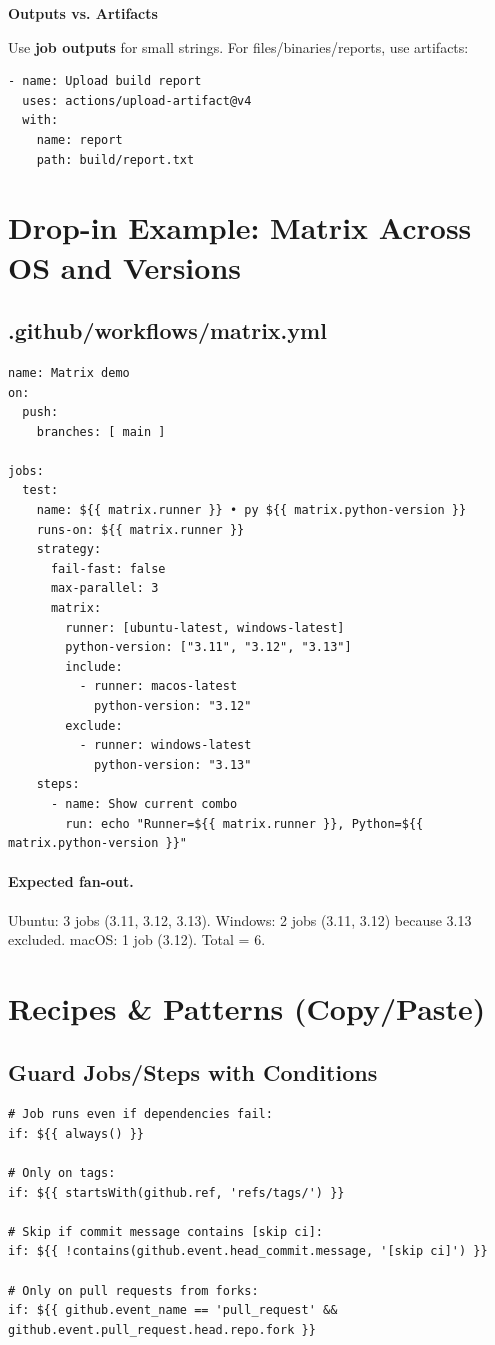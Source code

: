 \documentclass[11pt]{article}
\newenvironment{callout}[1]{%
  \def\FrameCommand{\fcolorbox{calloutframe}{calloutback}}%
  \MakeFramed{\advance\hsize-\width \FrameRestore}%
  \noindent\textbf{#1}\par\medskip
}{%
  \endMakeFramed
}
\begin{document}
\begin{callout}{Outputs vs. Artifacts}
Use \textbf{job outputs} for small strings. For files/binaries/reports, use artifacts:
\end{callout}

\begin{verbatim}
- name: Upload build report
  uses: actions/upload-artifact@v4
  with:
    name: report
    path: build/report.txt
\end{verbatim}

\section{Drop-in Example: Matrix Across OS and Versions}
\subsection*{.github/workflows/matrix.yml}
\begin{verbatim}
name: Matrix demo
on:
  push:
    branches: [ main ]

jobs:
  test:
    name: ${{ matrix.runner }} • py ${{ matrix.python-version }}
    runs-on: ${{ matrix.runner }}
    strategy:
      fail-fast: false
      max-parallel: 3
      matrix:
        runner: [ubuntu-latest, windows-latest]
        python-version: ["3.11", "3.12", "3.13"]
        include:
          - runner: macos-latest
            python-version: "3.12"
        exclude:
          - runner: windows-latest
            python-version: "3.13"
    steps:
      - name: Show current combo
        run: echo "Runner=${{ matrix.runner }}, Python=${{ matrix.python-version }}"
\end{verbatim}

\paragraph{Expected fan-out.}
Ubuntu: 3 jobs (3.11, 3.12, 3.13). Windows: 2 jobs (3.11, 3.12) because 3.13 excluded. macOS: 1 job (3.12). Total = 6.
\clearpage

\section{Recipes \& Patterns (Copy/Paste)}
\subsection*{Guard Jobs/Steps with Conditions}
\begin{verbatim}
# Job runs even if dependencies fail:
if: ${{ always() }}

# Only on tags:
if: ${{ startsWith(github.ref, 'refs/tags/') }}

# Skip if commit message contains [skip ci]:
if: ${{ !contains(github.event.head_commit.message, '[skip ci]') }}

# Only on pull requests from forks:
if: ${{ github.event_name == 'pull_request' && github.event.pull_request.head.repo.fork }}
\end{verbatim}
\end{document}
